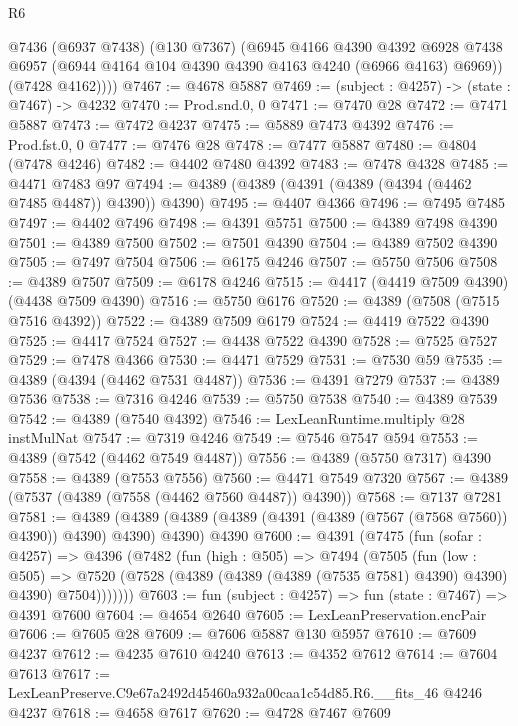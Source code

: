 \begin{lexlean}{R6}
\begin{coremodule}
        @7436
          (@6937 @7438)
          (@130 @7367)
          (@6945
            @4166
            @4390
            @4392
            @6928
            @7438
            @6957
            (@6944 @4164 @104 @4390 @4390 @4163 @4240 (@6966 @4163) @6969))
          (@7428 @4162))))
@7467 := @4678 @5887
@7469 := (subject : @4257) -> (state : @7467) -> @4232
@7470 := Prod.snd.{0, 0}
@7471 := @7470 @28
@7472 := @7471 @5887
@7473 := @7472 @4237
@7475 := @5889 @7473 @4392
@7476 := Prod.fst.{0, 0}
@7477 := @7476 @28
@7478 := @7477 @5887
@7480 := @4804 (@7478 @4246)
@7482 := @4402 @7480 @4392
@7483 := @7478 @4328
@7485 := @4471 @7483 @97
@7494 := @4389 (@4389 (@4391 (@4389 (@4394 (@4462 @7485 @4487)) @4390)) @4390)
@7495 := @4407 @4366
@7496 := @7495 @7485
@7497 := @4402 @7496
@7498 := @4391 @5751
@7500 := @4389 @7498 @4390
@7501 := @4389 @7500
@7502 := @7501 @4390
@7504 := @4389 @7502 @4390
@7505 := @7497 @7504
@7506 := @6175 @4246
@7507 := @5750 @7506
@7508 := @4389 @7507
@7509 := @6178 @4246
@7515 := @4417 (@4419 @7509 @4390) (@4438 @7509 @4390)
@7516 := @5750 @6176
@7520 := @4389 (@7508 (@7515 @7516 @4392))
@7522 := @4389 @7509 @6179
@7524 := @4419 @7522 @4390
@7525 := @4417 @7524
@7527 := @4438 @7522 @4390
@7528 := @7525 @7527
@7529 := @7478 @4366
@7530 := @4471 @7529
@7531 := @7530 @59
@7535 := @4389 (@4394 (@4462 @7531 @4487))
@7536 := @4391 @7279
@7537 := @4389 @7536
@7538 := @7316 @4246
@7539 := @5750 @7538
@7540 := @4389 @7539
@7542 := @4389 (@7540 @4392)
@7546 := LexLeanRuntime.multiply @28 instMulNat
@7547 := @7319 @4246
@7549 := @7546 @7547 @594
@7553 := @4389 (@7542 (@4462 @7549 @4487))
@7556 := @4389 (@5750 @7317) @4390
@7558 := @4389 (@7553 @7556)
@7560 := @4471 @7549 @7320
@7567 := @4389 (@7537 (@4389 (@7558 (@4462 @7560 @4487)) @4390))
@7568 := @7137 @7281
@7581 := @4389
    (@4389 (@4389 (@4389 (@4391 (@4389 (@7567 (@7568 @7560)) @4390)) @4390) @4390) @4390)
    @4390
@7600 := @4391
    (@7475
      (fun (sofar : @4257) =>
      @4396
        (@7482
          (fun (high : @505) =>
          @7494
            (@7505
              (fun (low : @505) =>
              @7520 (@7528 (@4389 (@4389 (@4389 (@7535 @7581) @4390) @4390) @4390) @7504)))))))
@7603 := fun (subject : @4257) => fun (state : @7467) => @4391 @7600
@7604 := @4654 @2640
@7605 := LexLeanPreservation.encPair
@7606 := @7605 @28
@7609 := @7606 @5887 @130 @5957
@7610 := @7609 @4237
@7612 := @4235 @7610 @4240
@7613 := @4352 @7612
@7614 := @7604 @7613
@7617 := LexLeanPreserve.C9e67a2492d45460a932a00caa1c54d85.R6.__fits_46 @4246 @4237
@7618 := @4658 @7617
@7620 := @4728 @7467 @7609

\end{coremodule}
\end{lexlean}
